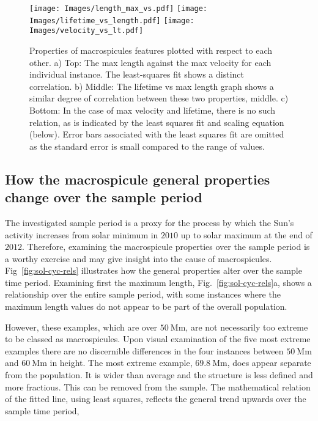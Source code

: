 \begin{figure}[h!]
	\centering
	\texttt{[image: Images/length\_max\_vs.pdf]}
	\texttt{[image: Images/lifetime\_vs\_length.pdf]}
	\texttt{[image: Images/velocity\_vs\_lt.pdf]}
	\caption{\small Properties of macrospicules features plotted with respect to each other. a) Top: The max length against the max velocity for each individual instance. The least-squares fit shows a distinct correlation. b) Middle: The lifetime vs max length graph shows a similar degree of correlation between these two properties, middle. c) Bottom: In the case of max velocity and lifetime, there is no such relation, as is indicated by the least squares fit and scaling equation (below). Error bars associated with the least squares fit are omitted as the standard error is small compared to the range of values.}
	\label{fig:prop-rel}	
\end{figure}


\subsection{How the macrospicule general properties change over the sample period}
The investigated sample period is a proxy for the process by which the Sun's activity increases from solar minimum in $2010$ up to solar maximum at the end of $2012$. Therefore, examining the macrospicule properties over the sample period is a worthy exercise and may give insight into the cause of macrospicules. Fig~\ref{fig:sol-cyc-rels} illustrates how the general properties alter over the sample time period. Examining first the maximum length, Fig.~\ref{fig:sol-cyc-rels}a, shows a relationship over the entire sample period, with some instances where the maximum length values do not appear to be part of the overall population. 

However, these examples, which are over $50\ \textrm{Mm}$, are not necessarily too extreme to be classed as macrospicules. Upon visual examination of the five most extreme examples there are no discernible differences in the four instances between $50\ \textrm{Mm}$ and $60\ \textrm{Mm}$ in height. The most extreme example, $69.8\ \textrm{Mm}$, does appear separate from the population. It is wider than average and the structure is less defined and more fractious. This can be removed from the sample. The mathematical relation of the fitted line, using least squares, reflects the general trend upwards over the sample time period, 

